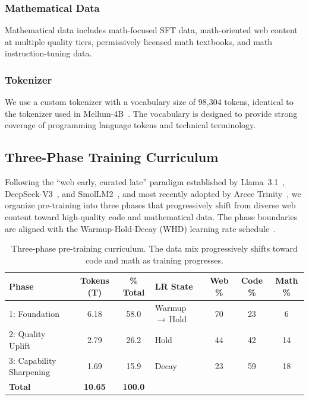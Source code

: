 \documentclass{llmxive}
\providecommand{\tableheadercolor}{}
\begin{document}
\subsubsection{Mathematical Data}

Mathematical data includes math-focused SFT data, math-oriented web content at
multiple quality tiers, permissively licensed math textbooks, and math instruction-tuning data.

\subsubsection{Tokenizer}

We use a custom tokenizer with a vocabulary size of 98{,}304 tokens, identical
to the tokenizer used in Mellum-4B~\cite{mellum2025}. The vocabulary is
designed to provide strong coverage of programming language tokens and
technical terminology.

\subsection{Three-Phase Training Curriculum}
\label{sec:curriculum}

Following the ``web early, curated late'' paradigm established by
Llama~3.1~\cite{grattafiori2024llama3}, DeepSeek-V3~\cite{deepseekai2025deepseekv3},
and SmolLM2~\cite{allal2025smollm2}, and most recently adopted by
Arcee Trinity~\cite{singh2026arcee}, we organize pre-training into three
phases that progressively shift from diverse web content toward high-quality
code and mathematical data. The phase boundaries are aligned with the
Warmup-Hold-Decay (WHD) learning rate schedule~\cite{hu2024minicpm,hagele2024scaling}.

\begin{table}[!htbp]
  \centering
  \small
  \setlength{\tabcolsep}{6pt}
  \begin{tabular}{@{}l
                  S[table-format=2.2]
                  S[table-format=3.1]
                  l
                  S[table-format=2.0]
                  S[table-format=2.0]
                  S[table-format=2.0]@{}}
    \toprule
    \tableheadercolor
    \textbf{Phase} & {\textbf{Tokens (T)}} & {\textbf{\% Total}} & \textbf{LR State} & {\textbf{Web \%}} & {\textbf{Code \%}} & {\textbf{Math \%}} \\
    : Foundation            &  6.18 & 58.0 & Warmup\,$\to$\,Hold & 70 & 23 &  6 \\
    2: Quality Uplift        &  2.79 & 26.2 & Hold                & 44 & 42 & 14 \\
    3: Capability Sharpening &  1.69 & 15.9 & Decay               & 23 & 59 & 18 \\
    \midrule
    \textbf{Total}           & \bfseries 10.65 & \bfseries 100.0 & & & & \\
    \bottomrule
  \end{tabular}
\caption{Three-phase pre-training curriculum. The data mix progressively
    shifts toward code and math as training progresses.}
\label{tab:curriculum}
\end{table}
\end{document}
